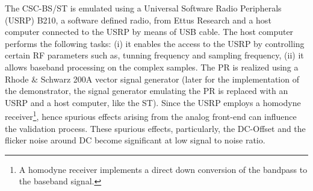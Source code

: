 The CSC-BS/ST is emulated using a Universal Software Radio Peripherals (USRP) B210, a software defined radio, from Ettus Research \cite{Ettus} and a host computer connected to the USRP by means of USB cable. The host computer performs the following tasks: (i) it enables the access to the USRP by controlling certain RF parameters such as, tunning frequency and sampling frequency, (ii) it allows baseband processing on the complex samples. %
The PR is realized using a Rhode $\&$ Schwarz 200A vector signal generator (later for the implementation of the demonstrator, the signal generator emulating the PR is replaced with an USRP and a host computer, like the ST). Since the USRP employs a homodyne receiver\footnote{A homodyne receiver implements a direct down conversion of the bandpass to the baseband signal.}, hence spurious effects arising from the analog front-end can influence the validation process. These spurious effects, particularly, the DC-Offset and the flicker noise around DC become significant at low signal to noise ratio. 

